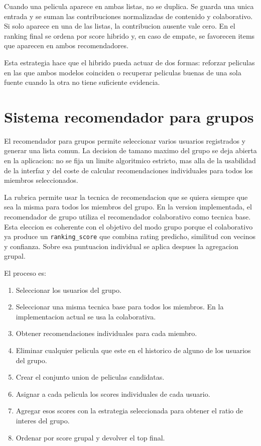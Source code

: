 \documentclass[12pt,a4paper]{article}
\begin{document}
Cuando una pelicula aparece en ambas listas, no se duplica. Se guarda una unica entrada y se suman las contribuciones normalizadas de contenido y colaborativo. Si solo aparece en una de las listas, la contribucion ausente vale cero. En el ranking final se ordena por score hibrido y, en caso de empate, se favorecen items que aparecen en ambos recomendadores.

Esta estrategia hace que el hibrido pueda actuar de dos formas: reforzar peliculas en las que ambos modelos coinciden o recuperar peliculas buenas de una sola fuente cuando la otra no tiene suficiente evidencia.

\section{Sistema recomendador para grupos}

El recomendador para grupos permite seleccionar varios usuarios registrados y generar una lista comun. La decision de tamano maximo del grupo se deja abierta en la aplicacion: no se fija un limite algoritmico estricto, mas alla de la usabilidad de la interfaz y del coste de calcular recomendaciones individuales para todos los miembros seleccionados.

La rubrica permite usar la tecnica de recomendacion que se quiera siempre que sea la misma para todos los miembros del grupo. En la version implementada, el recomendador de grupo utiliza el recomendador colaborativo como tecnica base. Esta eleccion es coherente con el objetivo del modo grupo porque el colaborativo ya produce un \texttt{ranking\_score} que combina rating predicho, similitud con vecinos y confianza. Sobre esa puntuacion individual se aplica despues la agregacion grupal.

El proceso es:

\begin{enumerate}[leftmargin=*]
\item Seleccionar los usuarios del grupo.
\item Seleccionar una misma tecnica base para todos los miembros. En la implementacion actual se usa la colaborativa.
\item Obtener recomendaciones individuales para cada miembro.
\item Eliminar cualquier pelicula que este en el historico de alguno de los usuarios del grupo.
\item Crear el conjunto union de peliculas candidatas.
\item Asignar a cada pelicula los scores individuales de cada usuario.
\item Agregar esos scores con la estrategia seleccionada para obtener el ratio de interes del grupo.
\item Ordenar por score grupal y devolver el top final.
\end{enumerate}
\end{document}
